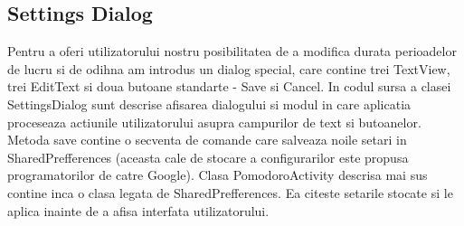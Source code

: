 \documentclass[12pt]{article}
\begin{document}
\subsection{Settings Dialog}
Pentru a oferi utilizatorului nostru posibilitatea de a modifica durata perioadelor de lucru si de odihna am introdus un dialog special, care contine trei TextView, trei EditText si doua butoane standarte - Save si Cancel. In codul sursa a clasei SettingsDialog sunt descrise afisarea dialogului si modul in care aplicatia proceseaza actiunile utilizatorului asupra campurilor de text si butoanelor. Metoda save contine o secventa de comande care salveaza noile setari in SharedPrefferences (aceasta cale de stocare a configurarilor este propusa programatorilor de catre Google). Clasa PomodoroActivity descrisa mai sus contine inca o clasa legata de SharedPrefferences. Ea citeste setarile stocate si le aplica inainte de a afisa interfata utilizatorului.
\end{document}
